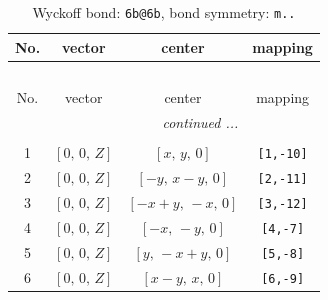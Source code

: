 \documentclass[fleqn,8pt]{jsarticle}
\begin{document}
\begin{longtable}{cccc}
\caption{Wyckoff bond: {\tt 6b@6b}, bond symmetry: {\tt m..}}
 \\
 \hline \hline
No. & vector & center & mapping \\ \hline \endfirsthead

\multicolumn{3}{l}{\tablename\ \thetable{}} \\
 \hline \hline
No. & vector & center & mapping \\ \hline \endhead

 \hline \hline
\multicolumn{3}{r}{\footnotesize\it continued ...} \\ \endfoot

 \hline \hline
\multicolumn{3}{r}{} \\ \endlastfoot

1 & $\left[ 0,\, 0,\, Z \right]$ & $\left[ x,\, y,\, 0 \right]$ & {\tt [1,-10]} \\ \hline
2 & $\left[ 0,\, 0,\, Z \right]$ & $\left[ - y,\, x - y,\, 0 \right]$ & {\tt [2,-11]} \\ \hline
3 & $\left[ 0,\, 0,\, Z \right]$ & $\left[ - x + y,\, - x,\, 0 \right]$ & {\tt [3,-12]} \\ \hline
4 & $\left[ 0,\, 0,\, Z \right]$ & $\left[ - x,\, - y,\, 0 \right]$ & {\tt [4,-7]} \\ \hline
5 & $\left[ 0,\, 0,\, Z \right]$ & $\left[ y,\, - x + y,\, 0 \right]$ & {\tt [5,-8]} \\ \hline
6 & $\left[ 0,\, 0,\, Z \right]$ & $\left[ x - y,\, x,\, 0 \right]$ & {\tt [6,-9]} \\
\end{longtable}
\renewcommand{\arraystretch}{1.2}
\end{document}
